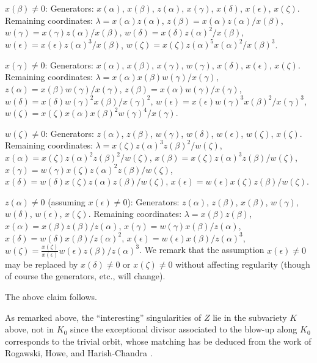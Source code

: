 \documentclass[12pt,letterpaper]{amsart}
\begin{document}
\medskip
\noindent
$x(\beta)\not= 0$: Generators: $x(\alpha)$, $x(\beta)$, $z(\alpha)$, $x(\gamma)$, $x(\delta)$, $x(\epsilon)$, $x(\zeta)$. Remaining coordinates:
$\lambda=x(\alpha)z(\alpha)$, $z(\beta)=x(\alpha)z(\alpha)/x(\beta)$,
$w(\gamma)=x(\gamma)z(\alpha)/x(\beta)$,
$w(\delta)=x(\delta)z(\alpha)^2 /x(\beta)$,
$w(\epsilon)=x(\epsilon)z(\alpha)^3 /x(\beta)$,
$w(\zeta)=x(\zeta)z(\alpha)^5 x(\alpha)^2 /x(\beta)^3$.

\medskip
\noindent
$x(\gamma)\not= 0$: Generators: $x(\alpha)$, $x(\beta)$, $x(\gamma)$, $w(\gamma)$, $x(\delta)$, $x(\epsilon)$, $x(\zeta)$. Remaining coordinates:
$\lambda=x(\alpha)x(\beta)w(\gamma)/x(\gamma)$,
$z(\alpha)=x(\beta)w(\gamma)/x(\gamma)$, $z(\beta)=x(\alpha)w(\gamma)/x(\gamma)$,
$w(\delta)=x(\delta)w(\gamma)^2 x(\beta)/x(\gamma)^2$,
$w(\epsilon)=x(\epsilon)w(\gamma)^3 x(\beta)^2 /x(\gamma)^3$,
$w(\zeta)=x(\zeta)x(\alpha) x(\beta)^2 w(\gamma)^4 /x(\gamma)$.

\medskip
\noindent
$w(\zeta)\not= 0$: Generators: $z(\alpha)$, $z(\beta)$, $w(\gamma)$, $w(\delta)$, $w(\epsilon)$, $w(\zeta)$, $x(\zeta)$. Remaining coordinates:
$\lambda=x(\zeta)z(\alpha)^3 z(\beta)^2 /w(\zeta)$,
$x(\alpha)=x(\zeta)z(\alpha)^2 z(\beta)^2 /w(\zeta)$,
$x(\beta)=x(\zeta)z(\alpha)^3 z(\beta) /w(\zeta)$,
$x(\gamma)=w(\gamma)x(\zeta) z(\alpha)^2 z(\beta) /w(\zeta)$,
$x(\delta)=w(\delta)x(\zeta) z(\alpha) z(\beta) /w(\zeta)$,
$x(\epsilon)=w(\epsilon)x(\zeta)z(\beta) /w(\zeta)$.

\medskip
\noindent
$z(\alpha)\not= 0$ (assuming $x(\epsilon)\not=0$):
Generators: $z(\alpha)$, $z(\beta)$, $x(\beta)$, $w(\gamma)$, $w(\delta)$, $w(\epsilon)$, $x(\zeta)$. Remaining coordinates:
$\lambda=x(\beta)z(\beta)$, $x(\alpha)=x(\beta)z(\beta)/z(\alpha)$,
$x(\gamma)=w(\gamma)x(\beta)/z(\alpha)$,
$x(\delta)=w(\delta)x(\beta)/z(\alpha)^2$,
$x(\epsilon)=w(\epsilon)x(\beta)/z(\alpha)^3$,
$w(\zeta)=\frac{x(\zeta)}{x(\epsilon)} w(\epsilon)z(\beta) /z(\alpha)^3$.
We remark that the assumption $x(\epsilon)\not=0$ may be
replaced by $x(\delta)\not= 0$ or $x(\zeta)\not= 0$
without affecting regularity (though
of course the generators, etc., will change).

The above claim follows.

As remarked above, the ``interesting'' singularities of $Z$
lie in the subvariety $K$ above, not in $K_0$ since the exceptional
divisor associated to the blow-up along $K_0$ corresponds to the trivial orbit,
whose matching has be deduced from the
work of Rogawski, Howe, and Harish-Chandra \cite{Ro80}.
\end{document}

